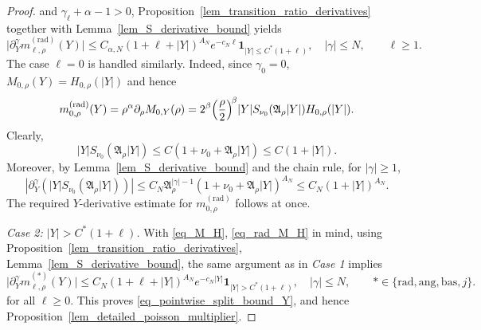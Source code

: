 \documentclass[12pt]{amsart}
\begin{document}
\begin{proof}
and $\gamma_\ell +\alpha-1>0$, Proposition~\ref{lem_transition_ratio_derivatives} together with Lemma~\ref{lem_S_derivative_bound} yields
\begin{equation*}
    \bigl| \partial_Y^{\gamma} m_{\ell,\rho}^{(\mathrm{rad})}(Y) \bigr|
    \le C_{\alpha,N} (1+\ell + |Y|)^{A_N} e^{-c_N \ell} \mathbf 1_{|Y|\le C^* (1+\ell)},\quad |\gamma|\le N,\qquad \ell \ge 1.
\end{equation*}
The case $\ell = 0$ is handled similarly. Indeed, since $\gamma_0=0$, $M_{0,\rho}(Y) = H_{0,\rho}(|Y|)$ and hence
\begin{equation*}
    m_{0,\rho}^{(\mathrm{rad})}(Y) = \rho^\alpha \partial_\rho M_{0, Y}(\rho)
    = 2^\beta \Bigl(\frac{\rho}{2}\Bigr)^{\!\beta}|Y| S_{\nu_0}(\mathfrak A_\rho |Y|) H_{0, \rho}(|Y|).
\end{equation*}
Clearly,
\begin{equation*}
    |Y|S_{\nu_0}(\mathfrak A_\rho |Y|)\le C(1+\nu_0+\mathfrak A_\rho |Y|)\le C(1+|Y|).
\end{equation*}
Moreover, by Lemma~\ref{lem_S_derivative_bound} and the chain rule, for $|\gamma|\ge 1$,
\begin{equation*}
    |\partial_Y^{\gamma}(|Y|S_{\nu_0}(\mathfrak A_\rho |Y|))|
    \le C_N \mathfrak A_\rho^{|\gamma|-1} (1+\nu_0+\mathfrak A_\rho |Y|)^{A_N}
    \le C_N (1+|Y|)^{A_N}.
\end{equation*}
The required $Y$-derivative estimate for $m_{0,\rho}^{(\mathrm{rad})}$ follows at once. 

\textit{Case 2: $|Y|>C^* (1+\ell)$.} With \eqref{eq_M_H}, \eqref{eq_rad_M_H} in mind, using Proposition~\ref{lem_transition_ratio_derivatives}, Lemma~\ref{lem_S_derivative_bound}, the same argument as in \textit{Case 1} implies 
\begin{equation*}
    \bigl|
        \partial_Y^\gamma m_{\ell,\rho}^{(*)}(Y)
    \bigr|
    \le
    C_N
    (1+\ell+|Y|)^{A_N}
        e^{-c_N |Y|}\mathbf 1_{|Y|> C^* (1+\ell)},\quad |\gamma|\le N,\qquad * \in \{\mathrm{rad}, \mathrm{ang}, \mathrm{bas}, j\}.
\end{equation*}
for all $\ell \ge 0$. This proves \eqref{eq_pointwise_split_bound_Y}, and hence Proposition~\ref{lem_detailed_poisson_multiplier}.
\end{proof}
\end{document}
